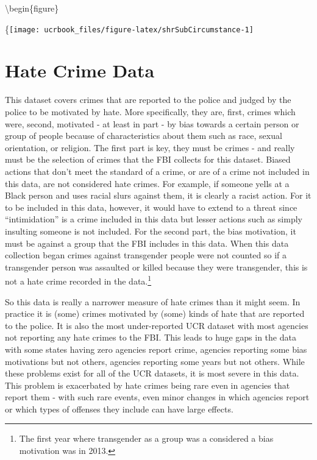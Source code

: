 \documentclass[
  12pt,
  openany]{book}
\begin{document}
\textbackslash begin\{figure\}

\{\centering \texttt{[image: ucrbook\_files/figure-latex/shrSubCircumstance-1]}

\hypertarget{hate_crimes}{%
\chapter{Hate Crime Data}\label{hate_crimes}}

This dataset covers crimes that are reported to the police and judged by the police to be motivated by hate. More specifically, they are, first, crimes which were, second, motivated - at least in part - by bias towards a certain person or group of people because of characteristics about them such as race, sexual orientation, or religion. The first part is key, they must be crimes - and really must be the selection of crimes that the FBI collects for this dataset. Biased actions that don't meet the standard of a crime, or are of a crime not included in this data, are not considered hate crimes. For example, if someone yells at a Black person and uses racial slurs against them, it is clearly a racist action. For it to be included in this data, however, it would have to extend to a threat since ``intimidation'' is a crime included in this data but lesser actions such as simply insulting someone is not included. For the second part, the bias motivation, it must be against a group that the FBI includes in this data. When this data collection began crimes against transgender people were not counted so if a transgender person was assaulted or killed because they were transgender, this is not a hate crime recorded in the data.\footnote{The first year where transgender as a group was a considered a bias motivation was in 2013.}

So this data is really a narrower measure of hate crimes than it might seem. In practice it is (some) crimes motivated by (some) kinds of hate that are reported to the police. It is also the most under-reported UCR dataset with most agencies not reporting any hate crimes to the FBI. This leads to huge gaps in the data with some states having zero agencies report crime, agencies reporting some bias motivations but not others, agencies reporting some years but not others. While these problems exist for all of the UCR datasets, it is most severe in this data. This problem is exacerbated by hate crimes being rare even in agencies that report them - with such rare events, even minor changes in which agencies report or which types of offenses they include can have large effects.
\end{document}
